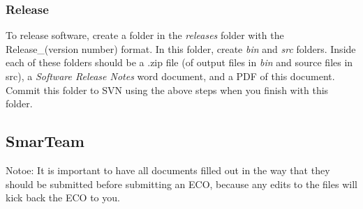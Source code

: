 \documentclass[10pt]{article}
\begin{document}
            \subsubsection{Release}
                To release software, create a folder in the \emph{releases} folder with the Release\_(version number) format. In this folder, create \emph{bin} and \emph{src} folders. Inside each of these folders should be a .zip file (of output files in \emph{bin} and source files in {src}), a \emph{Software Release Notes} word document, and a PDF of this document. Commit this folder to SVN using the above steps when you finish with this folder.
        \subsection{SmarTeam}
            Notoe: It is important to have all documents filled out in the way that they should be submitted before submitting an ECO, because any edits to the files will kick back the ECO to you.
\end{document}

